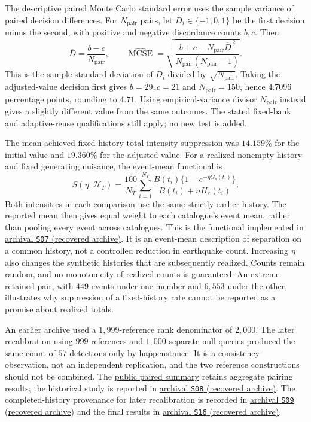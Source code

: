 The descriptive paired Monte Carlo standard error uses the sample variance of paired decision differences. For \(N_{\mathrm{pair}}\) pairs, let \(D_i\in\{-1,0,1\}\) be the first decision minus the second, with positive and negative discordance counts \(b,c\). Then
\[
 \overline D=\frac{b-c}{N_{\mathrm{pair}}},\qquad
 \widehat{\operatorname{MCSE}}
 =\sqrt{\frac{b+c-N_{\mathrm{pair}}\overline D^{\,2}}
 {N_{\mathrm{pair}}(N_{\mathrm{pair}}-1)}}.
\]
This is the sample standard deviation of \(D_i\) divided by \(\sqrt{N_{\mathrm{pair}}}\). Taking the adjusted-value decision first gives \(b=29,c=21\) and \(N_{\mathrm{pair}}=150\), hence \(4.7096\) percentage points, rounding to \(4.71\). Using empirical-variance divisor \(N_{\mathrm{pair}}\) instead gives a slightly different value from the same outcomes. The stated fixed-bank and adaptive-reuse qualifications still apply; no new test is added.

The mean achieved fixed-history total intensity suppression was \(14.159\%\) for the initial value and \(19.360\%\) for the adjusted value. For a realized nonempty history and fixed generating nuisance, the event-mean functional is
\begin{equation}
 S(\eta;\mathcal H_T)=\frac{100}{N_T}\sum_{i=1}^{N_T}
 \frac{B(t_i)\{1-e^{-\eta G_s(t_i)}\}}
      {B(t_i)+nH_e(t_i)}.
 \label{eq:achieved-suppression}
\end{equation}
Both intensities in each comparison use the same strictly earlier history. The reported mean then gives equal weight to each catalogue's event mean, rather than pooling every event across catalogues. This is the functional implemented in \hyperlink{S07}{archival \texttt{S07} (recovered archive)}.
It is an event-mean description of separation on a common history, not a controlled reduction in earthquake count. Increasing \(\eta\) also changes the synthetic histories that are subsequently realized. Counts remain random, and no monotonicity of realized counts is guaranteed. An extreme retained pair, with \(449\) events under one member and \(6{,}553\) under the other, illustrates why suppression of a fixed-history rate cannot be reported as a promise about realized totals.

An earlier archive used a \(1{,}999\)-reference rank denominator of \(2{,}000\). The later recalibration using \(999\) references and \(1{,}000\) separate null queries produced the same count of \(57\) detections only by happenstance. It is a consistency observation, not an independent replication, and the two reference constructions should not be combined. The \href{https://github.com/Drefetr/An_Evaluation_of_Earthquake_Models/blob/61aa599cd023f2441a6a0c6af9aa4b6fe9eda3e5/paper/data/paired.json}{public paired summary} retains aggregate pairing results; the historical study is reported in \hyperlink{S08}{archival \texttt{S08} (recovered archive)}. The completed-history provenance for later recalibration is recorded in \hyperlink{S09}{archival \texttt{S09} (recovered archive)} and the final results in \hyperlink{S16}{archival \texttt{S16} (recovered archive)}.

